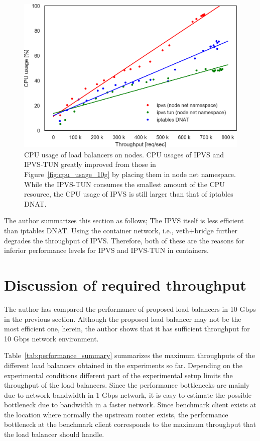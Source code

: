 \begin{figure}[h]
  \centering
  \includegraphics[width=0.8\columnwidth]{Figs/cpu_usage_10g_node_ns}
  \par\bigskip
  \centering
  \begin{minipage}{0.9\columnwidth}
    \caption[CPU usage of load balancers on nodes]{
      CPU usage of load balancers on nodes.
      CPU usages of IPVS and IPVS-TUN greatly improved from those in Figure~\ref{fig:cpu_usage_10g} by placing them in node net namespace.  
      While the IPVS-TUN consumes the smallest amount of the CPU resource, the CPU usage of IPVS is still larger than that of iptables DNAT.
    }
    \label{fig:cpu_usage_10g_node_ns}
  \end{minipage}
\end{figure}

The author summarizes this section as follows;
The IPVS itself is less efficient than iptables DNAT.
Using the container network, i.e., veth+bridge further degrades the throughput of IPVS.
Therefore, both of these are the reasons for inferior performance levels for IPVS and IPVS-TUN in containers.

\FloatBarrier

\section{Discussion of required throughput}

The author has compared the performance of proposed load balancers in 10 Gbps in the previous section.
Although the proposed load balancer may not be the most efficient one, herein, the author shows that it has sufficient throughput for 10 Gbps network environment.

Table~\ref{tab:performance_summary} summarizes the maximum throughputs of the different load balancers obtained in the experiments so far.
Depending on the experimental conditions different part of the experimental setup limits the throughput of the load balancers.
Since the performance bottlenecks are mainly due to network bandwidth in 1 Gbps network, it is easy to estimate the possible bottleneck due to bandwidth in a faster network.
Since benchmark client exists at the location where normally the upstream router exists, the performance bottleneck at the benchmark client corresponds to the maximum throughput that the load balancer should handle.

